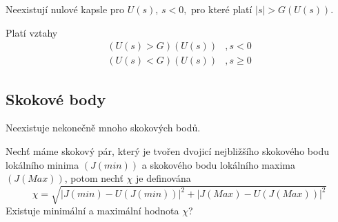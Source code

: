  \begin{conjecture}
       Neexistují nulové kapsle pro \(U(s)\), 
       \(s < 0,\) pro které platí \(|s|>G(U(s))\).
 \end{conjecture}
 
 \begin{conjecture}
       Platí vztahy
       \begin{align}
             (U(s) > G)(U(s)) &, s < 0 \\
             ( U(s) < G)(U(s)) &, s \geq 0
       \end{align}
 \end{conjecture}
 
 \subsection{Skokové body}
 
\begin{conjecture}
      Neexistuje nekonečně mnoho skokových bodů.
\end{conjecture}

\begin{question}
      Nechť máme skokový pár, který je tvořen dvojicí nejbližšího 
      skokového bodu lokálního minima \((J(min))\) a skokového bodu 
      lokálního maxima \((J(Max) )\), potom nechť \(\chi\) je definována
      \[\chi = \sqrt{|J(min) - U(J(min))|^2 + |J(Max) - U(J(Max))|^2}\]
      Existuje minimální a maximální hodnota \(\chi\)?
\end{question}
